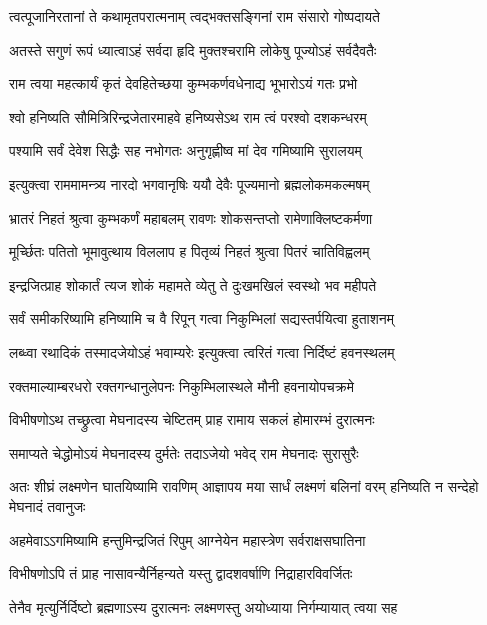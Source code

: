 \twolineshloka
{त्वत्पूजानिरतानां ते कथामृतपरात्मनाम्}
{त्वद्भक्तसङ्गिनां राम संसारो गोष्पदायते} %

\twolineshloka
{अतस्ते सगुणं रूपं ध्यात्वाऽहं सर्वदा हृदि}
{मुक्तश्चरामि लोकेषु पूज्योऽहं सर्वदैवतैः} %

\twolineshloka
{राम त्वया महत्कार्यं कृतं देवहितेच्छया}
{कुम्भकर्णवधेनाद्य भूभारोऽयं गतः प्रभो} %

\twolineshloka
{श्वो हनिष्यति सौमित्रिरिन्द्रजेतारमाहवे}
{हनिष्यसेऽथ राम त्वं परश्वो दशकन्धरम्} %

\twolineshloka
{पश्यामि सर्वं देवेश सिद्धैः सह नभोगतः}
{अनुगृह्णीष्व मां देव गमिष्यामि सुरालयम्} %

\twolineshloka
{इत्युक्त्वा राममामन्त्र्य नारदो भगवानृषिः}
{ययौ देवैः पूज्यमानो ब्रह्मलोकमकल्मषम्} %

\twolineshloka
{भ्रातरं निहतं श्रुत्वा कुम्भकर्णं महाबलम्}
{रावणः शोकसन्तप्तो रामेणाक्लिष्टकर्मणा} %

\twolineshloka
{मूर्च्छितः पतितो भूमावुत्थाय विललाप ह}
{पितृव्यं निहतं श्रुत्वा पितरं चातिविह्वलम्} %

\twolineshloka
{इन्द्रजित्प्राह शोकार्तं त्यज शोकं महामते}
{व्येतु ते दुःखमखिलं स्वस्थो भव महीपते} %

\twolineshloka
{सर्वं समीकरिष्यामि हनिष्यामि च वै रिपून्}
{गत्वा निकुम्भिलां सद्यस्तर्पयित्वा हुताशनम्} %

\twolineshloka
{लब्ध्वा रथादिकं तस्मादजेयोऽहं भवाम्यरेः}
{इत्युक्त्वा त्वरितं गत्वा निर्दिष्टं हवनस्थलम्} %

\twolineshloka
{रक्तमाल्याम्बरधरो रक्तगन्धानुलेपनः}
{निकुम्भिलास्थले मौनी हवनायोपचक्रमे} %

\twolineshloka
{विभीषणोऽथ तच्छ्रुत्वा मेघनादस्य चेष्टितम्}
{प्राह रामाय सकलं होमारम्भं दुरात्मनः} %

\twolineshloka
{समाप्यते चेद्धोमोऽयं मेघनादस्य दुर्मतेः}
{तदाऽजेयो भवेद् राम मेघनादः सुरासुरैः} %

\threelineshloka
{अतः शीघ्रं लक्ष्मणेन घातयिष्यामि रावणिम्}
{आज्ञापय मया सार्धं लक्ष्मणं बलिनां वरम्}
{हनिष्यति न सन्देहो मेघनादं तवानुजः} %


\twolineshloka
{अहमेवाऽऽगमिष्यामि हन्तुमिन्द्रजितं रिपुम्}
{आग्नेयेन महास्त्रेण सर्वराक्षसघातिना} %

\twolineshloka
{विभीषणोऽपि तं प्राह नासावन्यैर्निहन्यते}
{यस्तु द्वादशवर्षाणि निद्राहारविवर्जितः} %

\twolineshloka
{तेनैव मृत्युर्निर्दिष्टो ब्रह्मणाऽस्य दुरात्मनः}
{लक्ष्मणस्तु अयोध्याया निर्गम्यायात् त्वया सह} %

